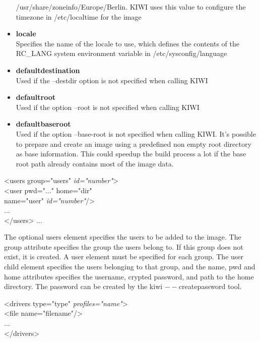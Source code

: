 \begin{itemize}
      /usr/share/zoneinfo/Europe/Berlin. KIWI uses this value to configure
      the timezone in /etc/localtime for the image
\item \textbf{locale}\\
      Specifies the name of the locale to use, which defines the
      contents of the RC\_LANG system environment variable in
      /etc/sysconfig/language
\item \textbf{defaultdestination}\\
      Used if the --destdir option is not specified when calling KIWI
\item \textbf{defaultroot}\\
      Used if the option --root is not specified when calling KIWI
\item \textbf{defaultbaseroot}\\
      Used if the option --base-root is not specified when
      calling KIWI. It's possible to prepare and create an image using a
      predefined non empty root directory as base information.
      This could speedup the build process a lot if the base root path
      already contains most of the image data.
\end{itemize}

\begin{Command}{12cm}
<users group="users" \textit{id="number"}>\\
\hspace*{1cm}<user pwd="..." home="dir"\\ 
\hspace*{1.5cm}name="user" \textit{id="number"}/>\\
\hspace*{1cm}...\\
</users>
...
\end{Command}

The optional users element specifies the users to be added to the image.
The group attribute specifies the group the users belong to. If this group
does not exist, it is created. A user element must be specified for
each group. The user child element specifies the users belonging to that
group, and the name, pwd and home attributes specifies the username,
crypted password, and path to the home directory. The password can be
created by the kiwi $--$createpassword tool.

\begin{Command}{12cm}
<drivers type="type" \textit{profiles="name"}>\\
\hspace*{1cm}<file name="filename"/>\\
\hspace*{1cm}...\\
</drivers>
\end{Command}

